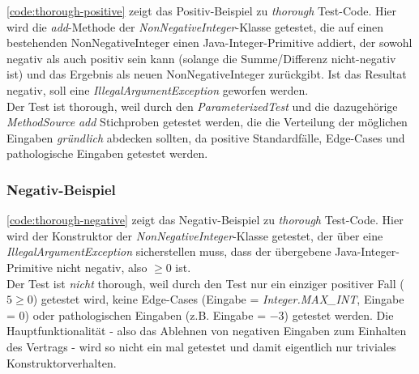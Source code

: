 \autoref{code:thorough-positive} zeigt das Positiv-Beispiel zu \textit{thorough} Test-Code. Hier wird 
die \textit{add}-Methode der \textit{NonNegativeInteger}-Klasse getestet, die auf einen bestehenden 
NonNegativeInteger einen Java-Integer-Primitive addiert, der sowohl negativ als auch positiv sein kann (solange 
die Summe/Differenz nicht-negativ ist) und das Ergebnis als neuen NonNegativeInteger zurückgibt. Ist das 
Resultat negativ, soll eine \textit{IllegalArgumentException} geworfen werden. \\
Der Test ist thorough, weil durch den \textit{ParameterizedTest} und die dazugehörige \textit{MethodSource} \textit{add}
Stichproben getestet werden, die die Verteilung der möglichen Eingaben \textit{gründlich} abdecken sollten, 
da positive Standardfälle, Edge-Cases und pathologische Eingaben getestet werden.    



\subsubsection{Negativ-Beispiel}

\autoref{code:thorough-negative} zeigt das Negativ-Beispiel zu \textit{thorough} Test-Code. Hier wird 
der Konstruktor der \textit{NonNegativeInteger}-Klasse getestet, der über eine \textit{IllegalArgumentException} 
sicherstellen muss, dass der übergebene Java-Integer-Primitive nicht negativ, also $\geq 0$ ist. \\
Der Test ist \textit{nicht} thorough, weil durch den Test nur ein einziger positiver Fall ($5 \geq 0$) getestet 
wird, keine Edge-Cases (Eingabe = \textit{Integer.MAX\_INT}, Eingabe = $0$) oder pathologischen Eingaben 
(z.B. Eingabe = $-3$) getestet werden. Die Hauptfunktionalität - also das Ablehnen von negativen Eingaben zum 
Einhalten des Vertrags - wird so nicht ein mal getestet und damit eigentlich nur triviales Konstruktorverhalten.

